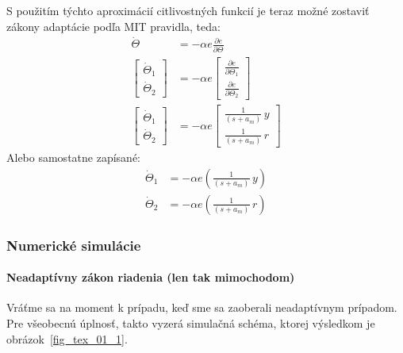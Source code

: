 \documentclass[a4paper, 10pt, ]{article}
\begin{document}
S použitím týchto aproximácií citlivostných funkcií je teraz možné zostaviť zákony adaptácie podľa MIT pravidla, teda:
\begin{subequations}
    \begin{align}
        \dot \Theta &= - \alpha e \frac{\partial e}{\partial \Theta} \\
        \begin{bmatrix} \dot \Theta_1 \\ \dot \Theta_2 \end{bmatrix} &= - \alpha e \begin{bmatrix} \frac{\partial e}{\partial \Theta_1} \\ \frac{\partial e}{\partial \Theta_2} \end{bmatrix} \\
        \begin{bmatrix} \dot \Theta_1 \\ \dot \Theta_2 \end{bmatrix} &= - \alpha e \begin{bmatrix} \frac{1}{\left( s + a_m \right)}\, y \\ \frac{1}{\left( s + a_m \right)}\, r \end{bmatrix}
    \end{align}
\end{subequations}
Alebo samostatne zapísané:
\begin{subequations}
    \begin{align}
        \dot \Theta_1 &= - \alpha e \left( \frac{1}{\left( s + a_m \right)}\, y \right) \\
        \dot \Theta_2 &= - \alpha e \left( \frac{1}{\left( s + a_m \right)}\, r \right)
    \end{align}
\end{subequations}




\subsubsection{Numerické simulácie}
\label{ss1rnumsim}




\paragraph{Neadaptívny zákon riadenia (len tak mimochodom)}

Vráťme sa na moment k prípadu, keď sme sa zaoberali neadaptívnym prípadom. Pre všeobecnú úplnosť, takto vyzerá simulačná schéma, ktorej výsledkom je obrázok~\ref{fig_tex_01_1}.
\end{document}
